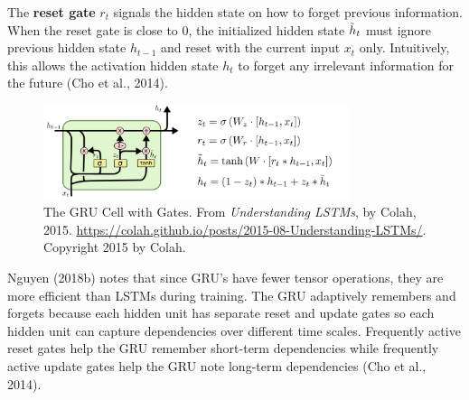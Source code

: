 The \textbf{reset gate} $r_t$ signals the hidden state on how to forget previous information. When the reset gate is close to $0$, the initialized hidden state $\Tilde{h}_t$ must ignore previous hidden state $h_{t-1}$ and reset with the current input $x_t$ only. Intuitively, this allows the activation hidden state $h_t$ to forget any irrelevant information for the future (Cho et al., 2014). 

\begin{figure}[h]
\vspace{-5pt}
\centering
\includegraphics[width=0.8\textwidth]{imgs/gru_withformula.png}
\vspace{-5pt}
\caption{\footnotesize The GRU Cell with Gates. From \emph{Understanding LSTMs}, by Colah, 2015. \url{https://colah.github.io/posts/2015-08-Understanding-LSTMs/}. Copyright 2015 by Colah.}
\vspace{-5pt}
\end{figure}

Nguyen (2018b) notes that since GRU's have fewer tensor operations, they are more efficient than LSTMs during training. 
The GRU adaptively remembers and forgets because each hidden unit has separate reset and update gates so each hidden unit can capture dependencies over different time scales. Frequently active reset gates help the GRU remember short-term dependencies while frequently active update gates help the GRU note long-term dependencies (Cho et al., 2014). 

